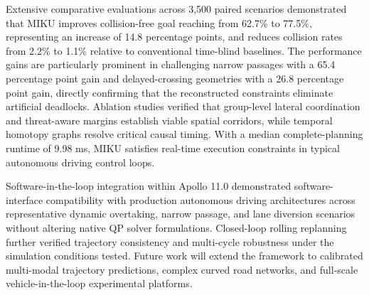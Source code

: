 Extensive comparative evaluations across 3,500 paired scenarios demonstrated that MIKU improves collision-free goal reaching from 62.7\% to 77.5\%, representing an increase of 14.8 percentage points, and reduces collision rates from 2.2\% to 1.1\% relative to conventional time-blind baselines. The performance gains are particularly prominent in challenging narrow passages with a 65.4 percentage point gain and delayed-crossing geometries with a 26.8 percentage point gain, directly confirming that the reconstructed constraints eliminate artificial deadlocks. Ablation studies verified that group-level lateral coordination and threat-aware margins establish viable spatial corridors, while temporal homotopy graphs resolve critical causal timing. With a median complete-planning runtime of 9.98 ms, MIKU satisfies real-time execution constraints in typical autonomous driving control loops.

Software-in-the-loop integration within Apollo 11.0 demonstrated software-interface compatibility with production autonomous driving architectures across representative dynamic overtaking, narrow passage, and lane diversion scenarios without altering native QP solver formulations. Closed-loop rolling replanning further verified trajectory consistency and multi-cycle robustness under the simulation conditions tested. Future work will extend the framework to calibrated multi-modal trajectory predictions, complex curved road networks, and full-scale vehicle-in-the-loop experimental platforms.
